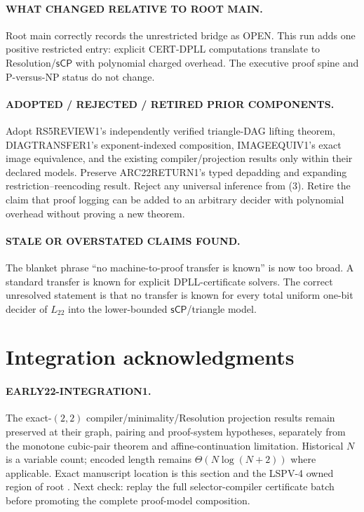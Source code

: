 \documentclass[11pt]{article}
\newcommand{\Ltwo}{L_{22}}
\newcommand{\sCP}{\mathsf{sCP}}
\begin{document}
\paragraph{WHAT CHANGED RELATIVE TO ROOT MAIN.}
Root main correctly records the unrestricted bridge as OPEN.  This run adds
one positive restricted entry: explicit CERT-DPLL computations translate to
Resolution/$\sCP$ with polynomial charged overhead.  The executive proof
spine and P-versus-NP status do not change.

\paragraph{ADOPTED / REJECTED / RETIRED PRIOR COMPONENTS.}
Adopt RS5REVIEW1's independently verified triangle-DAG lifting theorem,
DIAGTRANSFER1's exponent-indexed composition, IMAGEEQUIV1's exact image
equivalence, and the existing compiler/projection results only within their
declared models.  Preserve ARC22RETURN1's typed depadding and expanding
restriction--reencoding result.  Reject any universal inference from (3).
Retire the claim that proof logging can be added to an arbitrary decider with
polynomial overhead without proving a new theorem.

\paragraph{STALE OR OVERSTATED CLAIMS FOUND.}
The blanket phrase ``no machine-to-proof transfer is known'' is now too broad.
A standard transfer is known for explicit DPLL-certificate solvers.  The
correct unresolved statement is that no transfer is known for every total
uniform one-bit decider of $\Ltwo$ into the lower-bounded $\sCP$/triangle
model.

\section{Integration acknowledgments}
\paragraph{EARLY22-INTEGRATION1.}
The exact-$(2,2)$ compiler/minimality/Resolution projection results remain
preserved at their graph, pairing and proof-system hypotheses, separately from
the monotone cubic-pair theorem and affine-continuation limitation.  Historical
$N$ is a variable count; encoded length remains $\Theta(N\log(N+2))$ where
applicable.  Exact manuscript location is this section and the LSPV-4 owned
region of root .  Next check: replay the full selector-compiler
certificate batch before promoting the complete proof-model composition.
\end{document}

